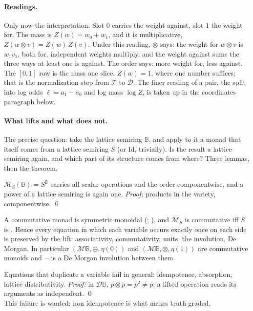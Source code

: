 \documentclass[anon]{../../journal-templates/NeSy26/nesy2026} %
\begin{document}
\paragraph{Readings.} Only now the interpretation. Slot $0$ carries the
weight against, slot $1$ the weight for. The mass is
$Z(w) = w_0 + w_1$, and it is multiplicative,
$Z(w \otimes v) = Z(w)\,Z(v)$. Under this reading, $\otimes$ says: the
weight for $w \otimes v$ is $w_1 v_1$, both for, independent weights
multiply, and the weight against sums the three ways at least one is
against. The order says: more weight for, less against. The $[0,1]$ row
is the mass one slice, $Z(w) = 1$, where one number suffices; that is
the normalization step from $\mathcal T$ to $\mathcal D$. The finer
reading of a pair, the split into log odds $\ell = a_1 - a_0$ and log
mass $\log Z$, is taken up in the coordinates paragraph below.

\paragraph{What lifts and what does not.} The precise question: take
the lattice semiring $\mathbb B$, and apply to it a monad that
itself comes from a lattice semiring $S$ (or $\mathrm{Id}$,
trivially). Is the result a lattice semiring again, and which
part of its structure comes from where? Three lemmas, then the theorem.

\begin{lemma}[pointwise]
$\mathcal M_S(\mathbb B) = S^{\mathbb B}$ carries all scalar operations
and the order componentwise, and a power of a lattice semiring
is again one.
\emph{Proof:} products in the variety, componentwise. \qed
\end{lemma}

\begin{lemma}
A commutative monad is symmetric monoidal
(\citealp[Thm.~3.2]{kockMonadsSymmetric1970};
\citealp[Thm.~2.3]{kockStrongFunctors1972}), and $\mathcal M_S$ is
commutative iff $S$ is \citep[Lem.~23]{coumansJacobsScalars2013}. Hence
every equation in which each variable occurs exactly once on each side
is preserved by the lift: associativity, commutativity, units, the
involution, De Morgan. In particular
$(\mathcal M\mathbb B, \oplus, \eta(0))$ and
$(\mathcal M\mathbb B, \otimes, \eta(1))$ are commutative monoids and
$\neg$ is a De Morgan involution between them.
\end{lemma}

\begin{lemma}
Equations that duplicate a variable fail in general: idempotence,
absorption, lattice distributivity.
\emph{Proof:} in $\mathcal D\mathbb B$,
$p \otimes p = p^{2} \ne p$; a lifted operation reads its arguments as
independent. \qed\\
This failure is wanted: non idempotence is what makes truth graded.
\end{lemma}
\end{document}
